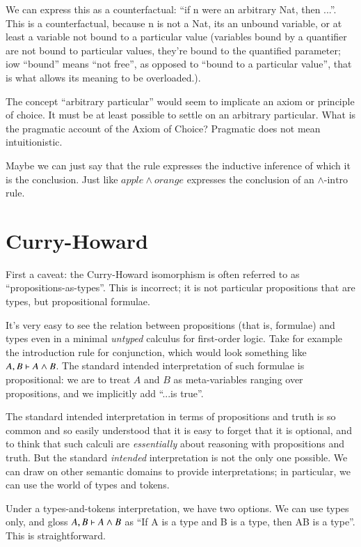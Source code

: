 \documentclass{article}
\begin{document}
We can express this as a counterfactual: ``if n were an arbitrary Nat,
then ...''. This is a counterfactual, because n is not a Nat, its an
unbound variable, or at least a variable not bound to a particular
value (variables bound by a quantifier are not bound to particular
values, they're bound to the quantified parameter; iow ``bound'' means
``not free'', as opposed to ``bound to a particular value'', that is
what allows its meaning to be overloaded.).

The concept ``arbitrary particular'' would seem to implicate an axiom
or principle of choice. It must be at least possible to settle on an
arbitrary particular. What is the pragmatic account of the Axiom of
Choice? Pragmatic does not mean intuitionistic.

Maybe we can just say that the rule
expresses the inductive inference of which it is the conclusion. Just
like \(apple\land orange\) expresses the conclusion of an
\(\land\scriptstyle{\text{-intro}}\) rule.

\section{Curry-Howard}

First a caveat: the Curry-Howard isomorphism is often referred to as
``propositions-as-types''. This is incorrect; it is not particular
propositions that are types, but propositional formulae.

It's very easy to see the relation between propositions (that is,
formulae) and types even in a minimal \textit{untyped} calculus for
first-order logic. Take for example the introduction rule for
conjunction, which would look something like \(A, B\vdash A\land B\).
The standard intended interpretation of such formulae is
propositional: we are to treat \(A\) and \(B\) as meta-variables
ranging over propositions, and we implicitly add ``...is true''.

The standard intended interpretation in terms of propositions and
truth is so common and so easily understood that it is easy to forget
that it is optional, and to think that such calculi are
\textit{essentially} about reasoning with propositions and truth. But
the standard \textit{intended} interpretation is not the only one
possible. We can draw on other semantic domains to provide
interpretations; in particular, we can use the world of types and
tokens.

Under a types-and-tokens interpretation, we have two options. We can
use types only, and gloss \(A, B\vdash A\land B\) as ``If A is a type
and B is a type, then A\lkand B is a type''. This is straightforward.
\end{document}
